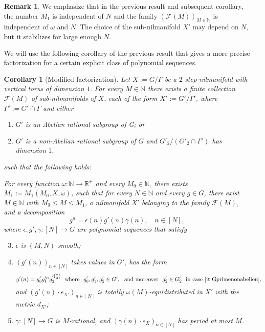 \documentclass[11pt]{amsart}
\newtheorem{corollary}[lemma]{Corollary}
\theoremstyle{definition}
\newtheorem*{remark}{Remark}
\begin{document}
\begin{remark} We emphasize  that in the previous result and subsequent
corollary, the number  $M_1$ is independent of $N$ and the  family
$({{\mathcal F}}(M))_{M\in {{\mathbb N}}}$ is independent of $\omega$ and $N$. The choice
of the sub-nilmanifold $X'$ may depend on $N$, but it stabilizes for
large enough $N$.
\end{remark}
We  will use  the following corollary of the previous result  that
 gives a more precise factorization for a certain explicit class of polynomial sequences.
 \begin{corollary}[Modified factorization]
\label{cor:factorization1} Let $X:=G/\Gamma$ be a $2$-step
nilmanifold with  vertical torus of dimension $1$.
For every $M\in{{\mathbb N}}$ there
exists a finite collection
${{\mathcal F}}(M)$ of sub-nilmanifolds of $X$, each  of the form
$X':=G'/\Gamma'$,
   where  $\Gamma':=G'\cap\Gamma$ and
 either
\begin{enumerate}
\item
\label{it:Gprimeabelien}   $G'$ is an Abelian rational subgroup of
G; or
\item
\label{it:Gprimenonabelien} $G'$ is a non-Abelian rational subgroup
of $G$ and $G'_2/(G'_2\cap\Gamma')$ has dimension $1$,
\end{enumerate}
such that the following holds:

For every 
function $\omega\colon {{\mathbb N}}\to{{\mathbb R}}^+$  and every $M_0\in {{\mathbb N}}$, there
exists $M_1:=M_1(M_0, X,\omega)$, such that for every $N\in{{\mathbb N}}$ and
every $g\in G$, there exist  $M \in {{\mathbb N}}$ with $M_0\leq M \leq M_1$, a
nilmanifold $X'$ belonging to the family ${{\mathcal F}}(M)$, and a
decomposition
$$
g^n = \epsilon(n) g'(n)\gamma(n), \quad n\in [N],
$$
 where $\epsilon,g',\gamma\colon [N]\to G$ are
polynomial sequences that satisfy
\begin{enumerate}
\setcounter{enumi}{2}
\item\label{it:dec3}
$\epsilon$ is $(M,N)$-smooth;
\item\label{it:dec4}
$(g'(n))_{n\in[N]}$  takes  values in $G'$, has the form
\begin{equation}
\label{eq:g-prime} g'(n)=g'_0g_1'^n g_2'^{\binom n 2}\  \text{ where
}\ g'_0,g'_1,g'_2\in G',\ \text{ and moreover } \ g'_2\in G'_2\
\text{ in case~\eqref{it:Gprimenonabelien}},
\end{equation}
and  $(g'(n)\cdot e_{X'})_{n\in[N]}$ is totally
$\omega(M)$-equidistributed in $X'$ with the metric $d_{X'}$;
\item\label{it:dec5}
$\gamma\colon [N]\to G$  is $M$-rational, and
$(\gamma(n)\cdot e_X)_{n\in[N]}$ has period at most $M$.
\end{enumerate}
\end{corollary}
\end{document}
